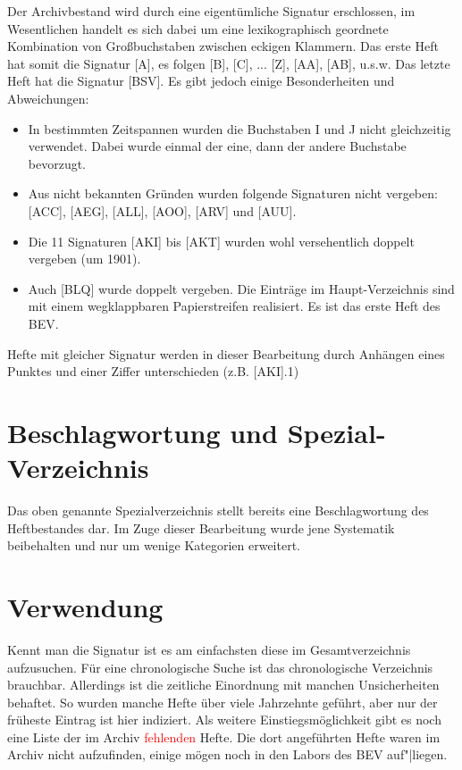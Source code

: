 \documentclass[a4paper]{scrbook}
\begin{document}
Der Archivbestand wird durch eine eigentümliche Signatur erschlossen, im Wesentlichen handelt es sich dabei um eine lexikographisch geordnete Kombination von Großbuchstaben zwischen eckigen Klammern. Das erste Heft hat somit die Signatur [A], es folgen [B], [C], ... [Z], [AA], [AB], u.s.w. Das letzte Heft hat die Signatur [BSV]. Es gibt jedoch einige Besonderheiten und Abweichungen:

\begin{itemize}
\item In bestimmten Zeitspannen wurden die Buchstaben I und J nicht gleichzeitig verwendet. Dabei wurde einmal der eine, dann der andere Buchstabe bevorzugt.
\item Aus nicht bekannten Gründen wurden folgende Signaturen nicht vergeben: [ACC], [AEG], [ALL], [AOO], [ARV] und [AUU].
\item Die 11 Signaturen [AKI] bis [AKT] wurden wohl versehentlich doppelt vergeben (um 1901).
\item Auch [BLQ] wurde doppelt vergeben. Die Einträge im Haupt-Verzeichnis sind mit einem wegklappbaren Papierstreifen realisiert. Es ist das erste Heft des BEV.
\end{itemize}
Hefte mit gleicher Signatur werden in dieser Bearbeitung durch Anhängen eines Punktes und einer Ziffer unterschieden (z.B. [AKI].1)

\section{Beschlagwortung und Spezial-Verzeichnis}

Das oben genannte \glqq{}Spezialverzeichnis\grqq{} stellt bereits eine Beschlagwortung des Heftbestandes dar. Im Zuge dieser Bearbeitung wurde jene Systematik beibehalten und nur um wenige Kategorien erweitert.

\section{Verwendung}

Kennt man die Signatur ist es am einfachsten diese im Gesamtverzeichnis aufzusuchen. Für eine chronologische Suche ist das chronologische Verzeichnis brauchbar. Allerdings ist die zeitliche Einordnung mit manchen Unsicherheiten behaftet. So wurden manche Hefte über viele Jahrzehnte geführt, aber nur der früheste Eintrag ist hier indiziert. Als weitere Einstiegsmöglichkeit gibt es noch eine Liste der im Archiv \textcolor{red}{fehlenden} Hefte. Die dort angeführten Hefte waren im Archiv nicht aufzufinden, einige mögen noch in den Labors des BEV auf"|liegen.
  
\end{document}
